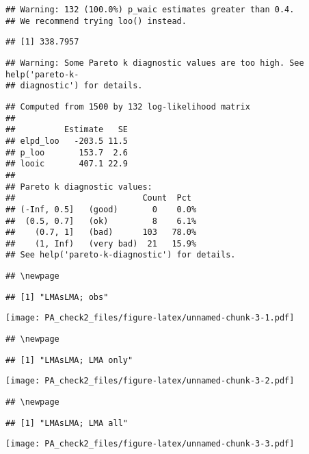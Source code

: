 \documentclass[12pt,]{article}
\begin{document}
\begin{verbatim}
## Warning: 132 (100.0%) p_waic estimates greater than 0.4.
## We recommend trying loo() instead.
\end{verbatim}

\begin{verbatim}
## [1] 338.7957
\end{verbatim}

\begin{verbatim}
## Warning: Some Pareto k diagnostic values are too high. See help('pareto-k-
## diagnostic') for details.
\end{verbatim}

\begin{verbatim}
## Computed from 1500 by 132 log-likelihood matrix
## 
##          Estimate   SE
## elpd_loo   -203.5 11.5
## p_loo       153.7  2.6
## looic       407.1 22.9
## 
## Pareto k diagnostic values:
##                          Count  Pct 
## (-Inf, 0.5]   (good)       0    0.0%
##  (0.5, 0.7]   (ok)         8    6.1%
##    (0.7, 1]   (bad)      103   78.0%
##    (1, Inf)   (very bad)  21   15.9%
## See help('pareto-k-diagnostic') for details.
\end{verbatim}

\begin{verbatim}
## \newpage
\end{verbatim}

\begin{verbatim}
## [1] "LMAsLMA; obs"
\end{verbatim}

\texttt{[image: PA\_check2\_files/figure-latex/unnamed-chunk-3-1.pdf]}

\begin{verbatim}
## \newpage
\end{verbatim}

\begin{verbatim}
## [1] "LMAsLMA; LMA only"
\end{verbatim}

\texttt{[image: PA\_check2\_files/figure-latex/unnamed-chunk-3-2.pdf]}

\begin{verbatim}
## \newpage
\end{verbatim}

\begin{verbatim}
## [1] "LMAsLMA; LMA all"
\end{verbatim}

\texttt{[image: PA\_check2\_files/figure-latex/unnamed-chunk-3-3.pdf]}
\end{document}
